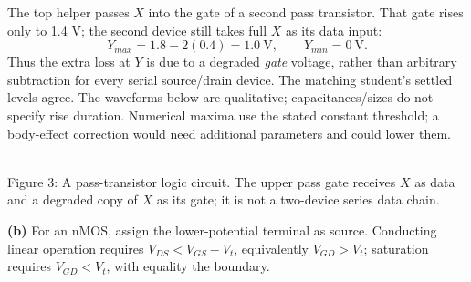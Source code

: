 \documentclass[10pt]{article}
\newcommand{\ground}[2]{\draw (#1,#2)--(#1,{#2-.12});\draw ({#1-.17},{#2-.12})--({#1+.17},{#2-.12});\draw ({#1-.11},{#2-.20})--({#1+.11},{#2-.20});}
\newcommand{\rail}[3]{\draw (#1,#2)--(#1,{#2+.14});\node[above,font=\scriptsize] at (#1,{#2+.14}) {$#3$};}
\newcommand{\hmos}[4]{\begin{scope}[shift={(#1,#2)}]
\draw(-.24,0)--(.24,0);\draw(-.2,0)--(-.2,-.25)--(-.5,-.25);\draw(.2,0)--(.2,-.25)--(.5,-.25);
\draw(-.23,.16)--(.23,.16);
\ifnum#4=1\draw(0,.26)circle(.06);\draw(0,.32)--(0,.75);\else\draw(0,.16)--(0,.75);\fi
\node[below,font=\scriptsize]at(0,-.32){#3};\end{scope}}
\begin{document}
The top helper passes $X$ into the gate of a second pass transistor. That gate rises only to 1.4 V; the second device still takes full $X$ as its data input:
\[\boxed{Y_{max}=1.8-2(0.4)=1.0\ \mathrm{V},\qquad Y_{min}=0\ \mathrm{V}.}\]
Thus the extra loss at $Y$ is due to a degraded \emph{gate} voltage, rather than arbitrary subtraction for every serial source/drain device. The matching student's settled levels agree. The waveforms below are qualitative; capacitances/sizes do not specify rise duration. Numerical maxima use the stated constant threshold; a body-effect correction would need additional parameters and could lower them.
\newpage
\begin{center}\\\small Figure 3: A pass-transistor logic circuit. The upper pass gate receives $X$ as data and a degraded copy of $X$ as its gate; it is not a two-device series data chain.\end{center}\begin{center}\end{center}
\textbf{(b)} For an nMOS, assign the lower-potential terminal as source. Conducting linear operation requires $V_{DS}<V_{GS}-V_t$, equivalently $V_{GD}>V_t$; saturation requires $V_{GD}<V_t$, with equality the boundary.
\end{document}

